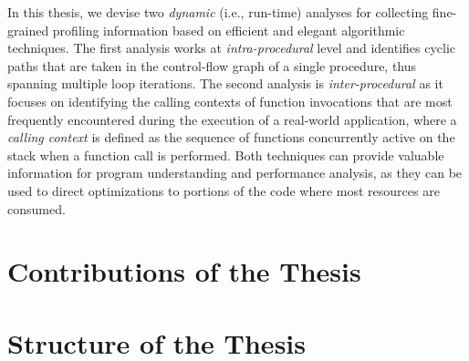 In this thesis, we devise two {\em dynamic} (i.e., run-time) analyses for collecting fine-grained profiling information based on efficient and elegant algorithmic techniques. The first analysis works at {\em intra-procedural} level and identifies cyclic paths that are taken in the control-flow graph of a single procedure, thus spanning multiple loop iterations.
The second analysis is {\em inter-procedural} as it focuses on identifying the calling contexts of function invocations that are most frequently encountered during the execution of a real-world application, where a {\em calling context} is defined as the sequence of functions concurrently active on the stack when a function call is performed. Both techniques can provide valuable information for program understanding and performance analysis, as they can be used to direct optimizations to portions of the code where most resources are consumed.

\section{Contributions of the Thesis}

\section{Structure of the Thesis}